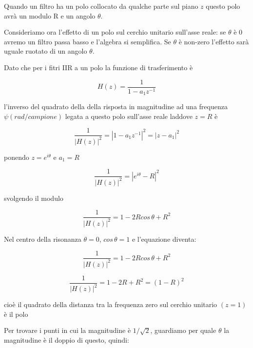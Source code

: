 	Quando un filtro ha un polo collocato da qualche parte sul piano $z$ questo
    polo avr\`a un modulo R e un angolo $\theta$.
  
	Consideriamo ora l'effetto di un polo sul cerchio unitario sull'asse reale:
    se $\theta$ \`e 0 avremo un filtro passa basso e l'algebra si semplifica. Se
    $\theta$ \`e non-zero l'effetto sar\`a uguale ruotato di un angolo
		$\theta$.
  
	Dato che per i fitri IIR a un polo la funzione di trasferimento \`e
  
		 \begin{equation}
				H(z) = \frac{1}{1 - a_1 z^{-1}}
		 \end{equation}

	l'inverso del quadrato della della risposta in magnitudine ad una frequenza
    $\psi (rad/campione)$ legata a questo polo sull'asse reale laddove $z = R$ \`e
  
		 \begin{equation}
				\frac{1}{|H(z)|^2} = |1 - a_1 z^{-1}|^2 = | z - a_1 |^2
		 \end{equation}
  
    ponendo $z = e^{i\theta}$ e $a_1 = R$
  
		 \begin{equation}
				\frac{1}{|H(z)|^2} =  |e^{i\theta} - R|^2
		 \end{equation}
  
    svolgendo il modulo
  
		 \begin{equation}
				\frac{1}{|H(z)|^2} =  1 - 2 R cos\,\theta + R^2
		 \end{equation}
  
	Nel centro della risonanza $\theta = 0$, $cos\,\theta = 1$ e l'equazione diventa:
  
		 \begin{equation}
				\frac{1}{|H(z)|^2} =  1 - 2 R cos\,\theta + R^2
		 \end{equation}

		 \begin{equation}
				\frac{1}{|H(z)|^2} =  1 - 2 R + R^2 = (1 - R)^2
		 \end{equation}

		cio\`e il quadrato della distanza tra
    la frequenza zero sul cerchio unitario $(z = 1)$ \`e il polo
  
  Per trovare i punti in cui la magnitudine \`e $1/\sqrt{2}$, guardiamo
    per quale $\theta$ la magnitudine \`e il doppio di questo, quindi:
  
